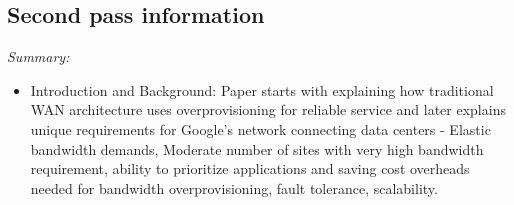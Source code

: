 \documentclass[letterpaper,twocolumn,10pt]{article}
\begin{document}
\subsection{Second pass information}
\label{sec:second}



{\it Summary:} 

\begin{itemize}
\item Introduction and Background: 
Paper starts with explaining how traditional WAN architecture uses overprovisioning for reliable service and later explains unique requirements for Google's network connecting data centers - Elastic bandwidth demands, Moderate number of sites with very high bandwidth requirement, ability to prioritize applications and saving cost overheads needed for bandwidth overprovisioning, fault tolerance, scalability.


\end{itemize}
\end{document}
